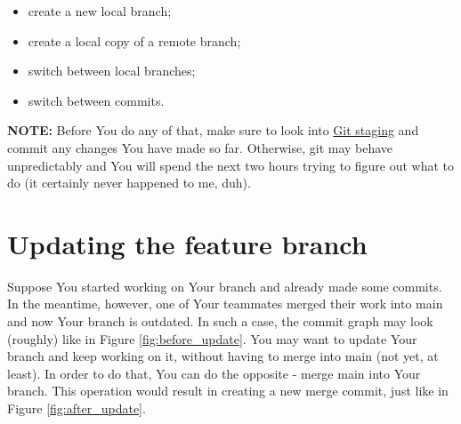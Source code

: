 \documentclass{article}
\begin{document}
\begin{itemize}
    \item create a new local branch;
    \item create a local copy of a remote branch;
    \item switch between local branches;
    \item switch between commits.
\end{itemize}

\textbf{NOTE: } Before You do any of that, make sure to look into \hyperref[sec:git_staging]{Git staging} and commit any changes You have made so far. Otherwise, git may behave unpredictably and You will spend the next two hours trying to figure out what to do (it certainly never happened to me, duh). 

\section{Updating the feature branch}

Suppose You started working on Your branch and already made some commits. In the meantime, however, one of Your teammates merged their work into main and now Your branch is outdated. In such a case, the commit graph may look (roughly) like in Figure \ref{fig:before_update}. You may want to update Your branch and keep working on it, without having to merge into main (not yet, at least). In order to do that, You can do the opposite - merge main into Your branch. This operation would result in creating a new merge commit, just like in Figure \ref{fig:after_update}.\newline
\end{document}
